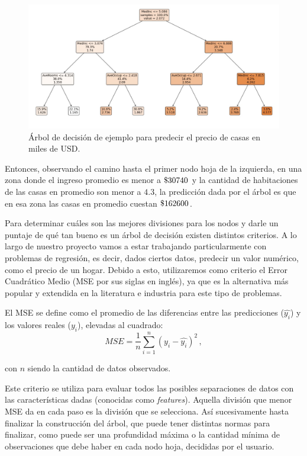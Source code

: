 \begin{figure}[h]
\centering
    \includegraphics[width=1\textwidth]{figures/marco-teorico/tree-ilustrativo.png}
\caption{Árbol de decisión de ejemplo para predecir el precio de casas en miles de USD.}
\end{figure}
\label{figure1}

Entonces, observando el camino hasta el primer nodo hoja de la izquierda, en una zona donde el ingreso promedio es menor a $\text{\textdollar} 30740$ y la cantidad de habitaciones de las casas en promedio son menor a $4.3$, la predicción dada por el árbol es que en esa zona las casas en promedio cuestan $\text{\textdollar} 162600$.

Para determinar cuáles son las mejores divisiones para los nodos y darle un puntaje de qué tan bueno es un árbol de decisión existen distintos criterios. A lo largo de nuestro proyecto vamos a estar trabajando particularmente con problemas de regresión, es decir, dados ciertos datos, predecir un valor numérico, como el precio de un hogar. Debido a esto, utilizaremos como criterio el Error Cuadrático Medio (MSE por sus siglas en inglés), ya que es la alternativa más popular y extendida en la literatura e industria para este tipo de problemas. 

El MSE se define como el promedio de las diferencias entre las predicciones ($\hat{y_{i}}$) y los valores reales ($y_{i}$), elevadas al cuadrado:
\[
MSE = \frac{1}{n} \sum_{i=1}^{n} (y_{i} - \hat{y_{i}})^2 \,,
\]

con $n$ siendo la cantidad de datos observados.

Este criterio se utiliza para evaluar todos las posibles separaciones de datos con las características dadas (conocidas como \textit{features}). Aquella división que menor MSE da en cada paso es la división que se selecciona. Así sucesivamente hasta finalizar la construcción del árbol, que puede tener distintas normas para finalizar, como puede ser una profundidad máxima o la cantidad mínima de observaciones que debe haber en cada nodo hoja, decididas por el usuario.


